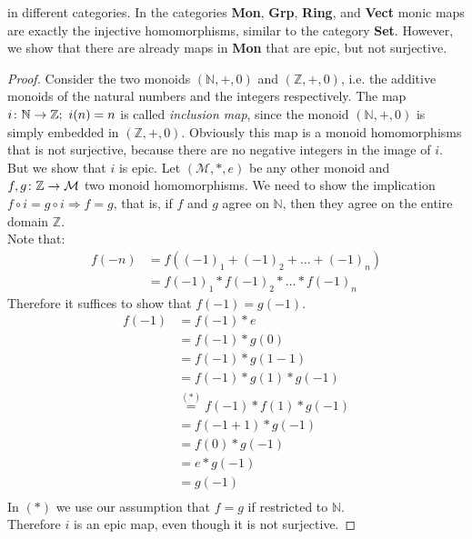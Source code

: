 in different categories.
In the categories \textbf{Mon}, \textbf{Grp}, \textbf{Ring}, and \textbf{Vect}
monic maps are exactly the injective homomorphisms,
similar to the category \textbf{Set}.
However, we show that there are already maps in \textbf{Mon} that are epic, but not surjective.
\begin{proof}
  Consider the two monoids $(\mathbb{N}, +, 0)$ and $(\mathbb{Z}, +, 0)$, i.e. the
  additive monoids of the natural numbers and the integers respectively.
  The map $i \from \mathbb{N} \to \mathbb{Z}; \ i(n) = n$ is called \emph{inclusion map},
  since the monoid $(\mathbb{N}, +, 0)$ is simply embedded in $(\mathbb{Z}, +, 0)$.
  Obviously this map is a monoid homomorphisms that is not surjective,
  because there are no negative integers in the image of $i$.
  But we show that $i$ is epic.
  Let $(\mathcal{M}, *, e)$ be any other monoid and $f, g \from \mathbb{Z} \to \mathcal{M}$ two
  monoid homomorphisms.
  We need to show the implication $f \circ i = g \circ i \Rightarrow f = g$, that is,
  if $f$ and $g$ agree on $\mathbb{N}$, then they agree on the entire domain $\mathbb{Z}$.\\
  Note that:
  \begin{align*}
    f(-n) &= f ((-1)_1 + (-1)_2 + \dots + (-1)_n)\\
          &= f(-1)_1 * f(-1)_2 * \dots * f(-1)_n
  \end{align*}
  Therefore it suffices to show that $f(-1) = g(-1)$.
  \begin{align*}
    f(-1) &= f(-1) * e \\
          &= f(-1) * g(0) \\
          &= f(-1) * g(1 - 1) \\
          &= f(-1) * g(1) * g(-1) \\
          &\overset{(*)}{=} f(-1) * f(1) * g(-1) \\
          &= f(-1 + 1) * g(-1) \\
          &= f(0) * g(-1) \\
          &= e * g(-1) \\
          &= g(-1) \\ 
  \end{align*}
  In $(*)$ we use our assumption that $f=g$ if restricted to $\mathbb{N}$.\\
  Therefore $i$ is an epic map, even though it is not surjective.
\end{proof}


